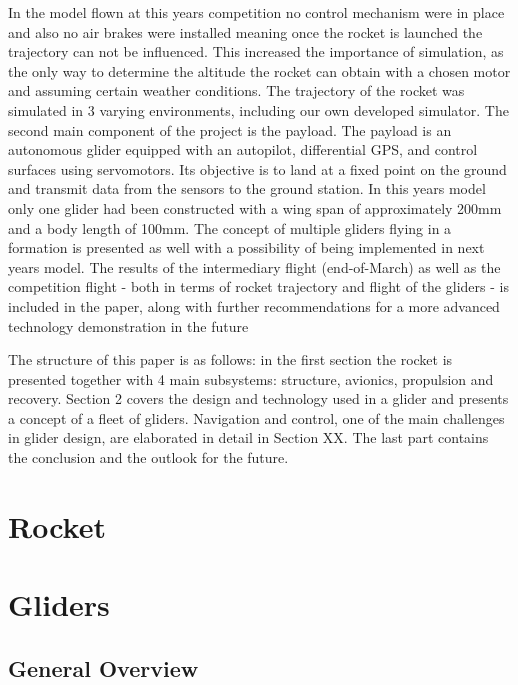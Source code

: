 \documentclass[]{iac}
\begin{document}
In the model flown at this years competition no control mechanism were in place and also no air brakes were installed meaning once the rocket is launched the trajectory can not be influenced. This increased the importance of simulation, as the only way to determine the altitude the rocket can obtain with a chosen motor and assuming certain weather conditions.  The trajectory of the rocket was simulated in 3 varying environments, including our own developed simulator. 
The second main component of the project is the payload. The payload is an autonomous glider equipped with an autopilot, differential GPS, and control surfaces using servomotors. Its objective is to land at a fixed point on the ground and transmit data from the sensors to the ground station. In this years model only one glider had been constructed with a wing span of approximately 200mm and a body length of 100mm. The concept of multiple gliders flying in a formation is presented as well with a possibility of being implemented in next years model.  
The results of the intermediary flight (end-of-March) as well as the competition flight - both in terms of rocket trajectory and flight of the gliders - is included in the paper, along with further recommendations for a more advanced technology demonstration in the future

The structure of this paper is as follows: in the first section the rocket is presented together with 4 main subsystems: structure, avionics, propulsion and recovery. Section 2 covers the design and technology used in a glider and presents a concept of a fleet of gliders. Navigation and control, one of the main challenges in glider design, are elaborated in detail in Section XX. The last part contains the conclusion and the outlook for the future. 




\section{Rocket}







\section{Gliders}

\subsection{General Overview}
\end{document}
